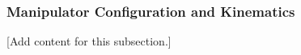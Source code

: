 
\subsubsection{Manipulator Configuration and Kinematics}
\label{subsubsec:design_2_1_4_manipulator_configuration_kinematics}

[Add content for this subsection.]
